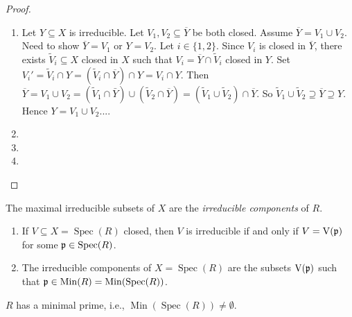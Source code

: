 \begin{proof}
    \begin{enumerate}
        \item Let $Y \subseteq X$ is irreducible. Let $V_1,V_2 \subseteq \overbar Y$ be both closed. Assume $\overbar Y = V_1 \cup V_2$. Need to show $\overbar Y = V_1$ or $Y = V_2$. Let $i \in \{1,2\}$. Since $V_i$ is closed in $\overbar Y$, there exists $\widetilde V_i \subseteq X$ closed in $X$ such that $V_i = \overbar Y \cap \widetilde V_i$ closed in $Y$. Set $V_i' = \widetilde V_i \cap Y = (\widetilde V_i \cap \overbar Y) \cap Y = V_i \cap Y$. Then $\overbar Y = V_1 \cup V_2 = (\widetilde V_1 \cap \bar Y) \cup (\widetilde V_2 \cap \overbar Y) = (\widetilde V_1 \cup \widetilde V_2) \cap \overbar Y$. So $\widetilde V_1 \cup \widetilde V_2 \supseteq \overbar Y \supseteq Y$. Hence $Y = V_1 \cup V_2$....
        \item 
        \item 
        \item 
    \end{enumerate}
\end{proof}

\begin{definition}
    The maximal irreducible subsets of $X$ are the \emph{irreducible components} of $R$.
\end{definition}

\begin{proposition}
    \begin{enumerate}
        \item If $V \subseteq X = \operatorname{Spec}(R)$ closed, then $V$ is irreducible if and only if $V = \operatorname{V}(\mathfrak{p})$ for some $\mathfrak{p} \in \operatorname{Spec}(R)$.
        \item The irreducible components of $X = \operatorname{Spec}(R)$ are the subsets $\operatorname{V}(\mathfrak{p})$ such that $\mathfrak{p} \in \operatorname{Min}(R) = \operatorname{Min}(\operatorname{Spec}(R))$.
    \end{enumerate}
\end{proposition}

\begin{example}

\end{example}

\begin{corollary}
    $R$ has a minimal prime, i.e., $\operatorname{Min}(\operatorname{Spec}(R)) \neq \emptyset$.
\end{corollary}

